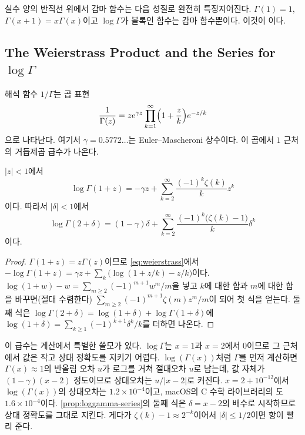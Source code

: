 실수 양의 반직선 위에서 감마 함수는 다음 성질로 완전히 특징지어진다. $\Gamma(1)=1$, $\Gamma(x+1)=x\Gamma(x)$이고 $\log\Gamma$가 볼록인 함수는 감마 함수뿐이다. 이것이 이다\cite{artin1964}.

\subsection{The Weierstrass Product and the Series for $\log\Gamma$}

해석 함수 $1/\Gamma$는 곱 표현
\begin{equation}
\label{eq:weierstrass}
\frac1{\Gamma(z)}=ze^{\gamma z}\prod_{k=1}^\infty\Bigl(1+\frac zk\Bigr)e^{-z/k}
\end{equation}
으로 나타난다. 여기서 $\gamma=0.5772\dots$는 Euler--Mascheroni 상수이다\cite{whittaker1927}. 이 곱에서 $1$ 근처의 거듭제곱 급수가 나온다.

\begin{proposition}
\label{prop:loggamma-series}
$|z|<1$에서
\[
\log\Gamma(1+z)=-\gamma z+\sum_{k=2}^\infty\frac{(-1)^k\zeta(k)}kz^k
\]
이다. 따라서 $|\delta|<1$에서
\[
\log\Gamma(2+\delta)=(1-\gamma)\delta+\sum_{k=2}^\infty\frac{(-1)^k\bigl(\zeta(k)-1\bigr)}k\delta^k
\]
이다.
\end{proposition}

\begin{proof}
$\Gamma(1+z)=z\Gamma(z)$이므로 \eqref{eq:weierstrass}에서 $-\log\Gamma(1+z)=\gamma z+\sum_k\bigl(\log(1+z/k)-z/k\bigr)$이다. $\log(1+w)-w=\sum_{m\ge2}(-1)^{m+1}w^m/m$을 넣고 $k$에 대한 합과 $m$에 대한 합을 바꾸면(절대 수렴한다) $\sum_{m\ge2}(-1)^{m+1}\zeta(m)z^m/m$이 되어 첫 식을 얻는다. 둘째 식은 $\log\Gamma(2+\delta)=\log(1+\delta)+\log\Gamma(1+\delta)$에 $\log(1+\delta)=\sum_{k\ge1}(-1)^{k+1}\delta^k/k$를 더하면 나온다.
\end{proof}

이 급수는 계산에서 특별한 쓸모가 있다. $\log\Gamma$는 $x=1$과 $x=2$에서 $0$이므로 그 근처에서 값은 작고 상대 정확도를 지키기 어렵다. $\log(\Gamma(x))$처럼 $\Gamma$를 먼저 계산하면 $\Gamma(x)\approx1$의 반올림 오차 $u$가 로그를 거쳐 절대오차 $u$로 남는데, 값 자체가 $(1-\gamma)(x-2)$ 정도이므로 상대오차는 $u/|x-2|$로 커진다. $x=2+10^{-12}$에서 $\log(\Gamma(x))$의 상대오차는 $1.2\times10^{-4}$이고, macOS의 C 수학 라이브러리의 도 $1.6\times10^{-4}$이다. \cref{prop:loggamma-series}의 둘째 식은 $\delta=x-2$의 배수로 시작하므로 상대 정확도를 그대로 지킨다. 게다가 $\zeta(k)-1\approx2^{-k}$이어서 $|\delta|\le1/2$이면 항이 빨리 준다.

